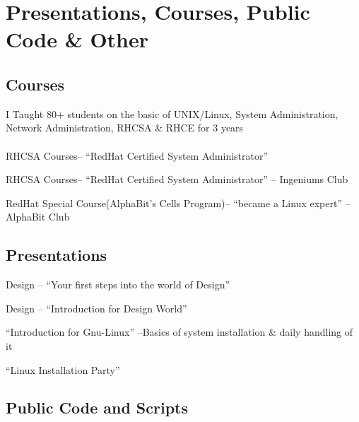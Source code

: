 \documentclass{cv}
\begin{document}
\section{Presentations, Courses, Public Code \& Other}
\subsection{Courses}
\label{sec:class}
I Taught 80+ students on the basic of UNIX/Linux, System Administration, Network Administration, RHCSA \& RHCE for 3 years\\\\
	{RHCSA Courses-- ``RedHat Certified System Administrator''}
	{\esi}

	{RHCSA Courses-- ``RedHat Certified System Administrator''}
	{\esi -- Ingeniums Club}

    {RedHat Special Course(AlphaBit's Cells Program)-- ``became a Linux expert''}
	{\esi -- AlphaBit Club}


\subsection{Presentations}
	{Design -- ``Your first steps into the world of Design''}
	{\med}

	{Design -- ``Introduction for Design World''}
	{\esi}

	{``Introduction for Gnu-Linux'' --Basics of system installation \& daily handling of it
	\href {https://github.com/kebairia/My_Presentations/blob/master/intro_linux} {\gh}}
	{\med}

        {``Linux Installation Party''}
	{\med}

\subsection{Public Code and Scripts}
\label{sec:code}
\end{document}
